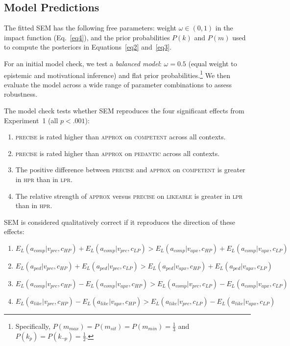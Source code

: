 \documentclass[12pt,a4paper]{article}
\newcommand{\xvar}[1]{\textsc{#1}}
\begin{document}
\subsection{Model Predictions}

The fitted SEM has the following free parameters: weight $\omega \in (0,1)$ in
the impact function (Eq.~\ref{eq4}), and the prior probabilities $P(k)$ and
$P(m)$ used to compute the posteriors in Equations~\ref{eq2} and~\ref{eq3}.

For an initial model check, we test a \emph{balanced model}: $\omega = 0.5$
(equal weight to epistemic and motivational inference) and flat prior
probabilities.\footnote{Specifically, $P(m_{max}) = P(m_{sit}) = P(m_{min}) =
\frac{1}{3}$ and $P(k_p) = P(k_{\neg p}) = \frac{1}{2}$.} We then evaluate
the model across a wide range of parameter combinations to assess robustness.

The model check tests whether SEM reproduces the four significant effects from
Experiment~1 (all $p < .001$):

\begin{enumerate}
\item \xvar{precise} is rated higher than \xvar{approx} on \xvar{competent}
across all contexts.

\item \xvar{precise} is rated higher than \xvar{approx} on \xvar{pedantic}
across all contexts.

\item The positive difference between \xvar{precise} and \xvar{approx} on
\xvar{competent} is greater in \xvar{hpr} than in \xvar{lpr}.

\item The relative strength of \xvar{approx} versus \xvar{precise} on
\xvar{likeable} is greater in \xvar{lpr} than in \xvar{hpr}.
\end{enumerate}

SEM is considered qualitatively correct if it reproduces the direction of these
effects:

\begin{enumerate}
\item $E_L(a_{comp}|v_{prc}, c_{HP}) + E_L(a_{comp}|v_{prc}, c_{LP}) >
       E_L(a_{comp}|v_{apx}, c_{HP}) + E_L(a_{comp}|v_{apx}, c_{LP})$

\item $E_L(a_{ped}|v_{prc}, c_{HP}) + E_L(a_{ped}|v_{prc}, c_{LP}) >
       E_L(a_{ped}|v_{apx}, c_{HP}) + E_L(a_{ped}|v_{apx}, c_{LP})$

\item $E_L(a_{comp}|v_{prc}, c_{HP}) - E_L(a_{comp}|v_{apx}, c_{HP}) >
       E_L(a_{comp}|v_{prc}, c_{LP}) - E_L(a_{comp}|v_{apx}, c_{LP})$

\item $E_L(a_{like}|v_{prc}, c_{HP}) - E_L(a_{like}|v_{apx}, c_{HP}) >
       E_L(a_{like}|v_{prc}, c_{LP}) - E_L(a_{like}|v_{apx}, c_{LP})$
\end{enumerate}
\end{document}
